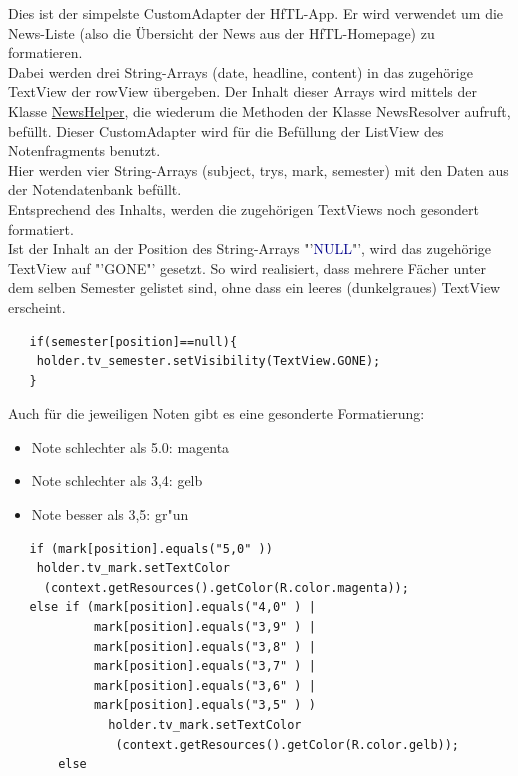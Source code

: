 \begin{description}
\label{CustomAdapterNews}
Dies ist der simpelste CustomAdapter der HfTL-App. Er wird verwendet um die News-Liste (also die Übersicht der News aus der HfTL-Homepage) zu formatieren.\\
Dabei werden drei String-Arrays (date, headline, content) in das zugehörige TextView der rowView übergeben. Der Inhalt dieser Arrays wird mittels der Klasse \hyperref[Newshelper]{NewsHelper}, die wiederum die Methoden der Klasse NewsResolver aufruft, befüllt.
\label{CustomAdapterNoten}
Dieser CustomAdapter wird für die Befüllung der ListView des Notenfragments benutzt.\\
Hier werden vier String-Arrays (\textcolor{lila}{subject}, \textcolor{lila}{trys}, \textcolor{lila}{mark}, \textcolor{lila}{semester}) mit den Daten aus der Notendatenbank befüllt.\\
Entsprechend des Inhalts, werden die zugehörigen TextViews noch gesondert formatiert.\\
Ist der Inhalt an der Position des String-Arrays "'\textcolor{darkblue}{NULL}"', wird das zugehörige TextView auf "'\textcolor{lila}{GONE}"' gesetzt. So wird realisiert, dass mehrere Fächer unter dem selben Semester gelistet sind, ohne dass ein leeres (dunkelgraues) TextView erscheint.
\begin{lstlisting}
   if(semester[position]==null){
    holder.tv_semester.setVisibility(TextView.GONE);
   }
\end{lstlisting}
Auch für die jeweiligen Noten gibt es eine gesonderte Formatierung:
\begin{itemize}
\item Note schlechter als 5.0: \textcolor{magentat}{magenta}
\item Note schlechter als 3,4: \textcolor{gelbt}{gelb}
\item Note besser als 3,5: \textcolor{gruent}{gr"un}
\end{itemize}
\begin{lstlisting}
   if (mark[position].equals("5,0" ))
    holder.tv_mark.setTextColor
     (context.getResources().getColor(R.color.magenta));
   else if (mark[position].equals("4,0" ) |
            mark[position].equals("3,9" ) |
            mark[position].equals("3,8" ) |
            mark[position].equals("3,7" ) |
            mark[position].equals("3,6" ) |
            mark[position].equals("3,5" ) )
              holder.tv_mark.setTextColor
               (context.getResources().getColor(R.color.gelb));
       else

\end{lstlisting}
\end{description}
